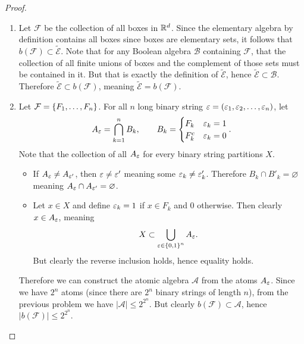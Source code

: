 \documentclass[hw_all.tex]{subfiles}
\begin{document}
\begin{proof}
    \begin{enumerate}
        \item 
            Let $\mathcal{F}$ be the collection of all boxes in $\mathbb{R}^d$. Since the elementary algebra by definition contains all boxes since boxes are elementary sets, it follows that $b(\mathcal{F}) \subset \tilde{\mathcal{E}}$. Note that for any Boolean algebra $\mathcal{B}$ containing $\mathcal{F}$, that the collection of all finite unions of boxes and the complement of those sets must be contained in it. But that is exactly the definition of $\tilde{\mathcal{E}}$, hence $\tilde{\mathcal{E}} \subset \mathcal{B}$. Therefore $\tilde{\mathcal{E}} \subset b(\mathcal{F})$, meaning $\tilde{\mathcal{E}} = b(\mathcal{F})$.

        \item 
            Let $\mathcal{F} = \qty{F_1, \ldots, F_n}$. For all $n$ long binary string $\varepsilon = (\varepsilon_1, \varepsilon_2, \ldots, \varepsilon_n)$, let
            \[
                A_{\varepsilon} = \bigcap_{k=1}^n B_k, \qquad B_k = \begin{cases}
                    F_k & \varepsilon_k = 1 \\
                    F_k^c & \varepsilon_k = 0 \\
                \end{cases}
            .\]
            Note that the collection of all $A_{\varepsilon}$ for every binary string partitions $X$.
            \begin{itemize}
                \item
                    If $A_{\varepsilon} \neq A_{\varepsilon'}$, then $\varepsilon \neq \varepsilon'$ meaning some $\varepsilon_k \neq \varepsilon'_k$. Therefore $B_k \cap B'_k = \varnothing$ meaning $A_{\varepsilon} \cap A_{\varepsilon'} = \varnothing$.
                \item 
                    Let $x \in X$ and define $\varepsilon_k = 1$ if $x \in F_k$ and $0$ otherwise. Then clearly $x \in A_{\varepsilon}$, meaning
                    \[
                        X \subset \bigcup_{\varepsilon \in \qty{0,1}^n} A_{\varepsilon}
                    .\]
                    But clearly the reverse inclusion holds, hence equality holds.
            \end{itemize}
            Therefore we can construct the atomic algebra $\mathcal{A}$ from the atoms $A_{\varepsilon}$. Since we have $2^n$ atoms (since there are $2^n$ binary strings of length $n$), from the previous problem we have $|\mathcal{A}| \leq 2^{2^n}$. But clearly $b(\mathcal{F}) \subset \mathcal{A}$, hence $|b(\mathcal{F})| \leq 2^{2^n}$.


\end{enumerate}
\end{proof}
\end{document}
